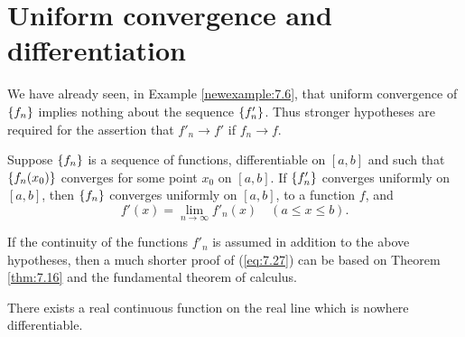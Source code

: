 \section{Uniform convergence and differentiation}

We have already seen, in Example \ref{newexample:7.6}, 
that uniform convergence of $\protect\{f_n\}$ implies
nothing about the sequence $\protect\{f'_n\}$. 
Thus stronger hypotheses are required for the assertion that 
$f'_n \rightarrow f'$ if $f_n \rightarrow f$.

\begin{thm}
    \label{thm:7.17}
    Suppose $\protect\{f_n\}$ is a sequence of functions, differentiable on $[a, b]$
    and such that $\protect\{f_n(x_0)\}$ converges for some point $x_0$ on $[a, b]$. 
    If $\protect\{f'_n\}$ converges uniformly on $[a, b ]$, 
    then $\protect\{f_n\}$ converges uniformly on $[a, b ]$, 
    to a function $f$, and
    \begin{equation}
        \label{eq:7.27}
        f'(x) = \lim_{n \to \infty} f'_n (x)
        \quad 
        (a \leq x \leq b).
    \end{equation}
\end{thm}


\begin{myRemark*}
    If the continuity of the functions $f'_n$ is assumed in addition to
    the above hypotheses, 
    then a much shorter proof of (\ref{eq:7.27}) can be based on
    Theorem \ref{thm:7.16} and the fundamental theorem of calculus.
\end{myRemark*}

\begin{thm}
    There exists a real continuous function on the real line which is
    nowhere differentiable.
\end{thm}

